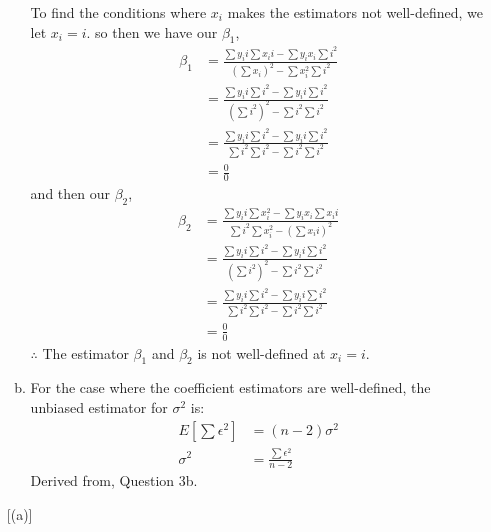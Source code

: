 \documentclass[12pt]{article}
\begin{document}
\begin{enumerate}[1.]
\begin{enumerate}[(a)]
            To find the conditions where $x_i$ makes the estimators not well-defined, we let $x_i = i$.
            so then we have our $\beta_1$,
            \begin{align*}
                \beta_1 &= \frac{\sum y_i i\sum  x_i i - \sum y_i  x_i \sum i^2}{(\sum  x_i)^2 - \sum  x_i^2 \sum i^2 } \\
                &= \frac{\sum y_i i\sum  i^2 - \sum y_i  i \sum i^2}{(\sum i^2)^2 - \sum i^2 \sum i^2 }\\
                &= \frac{\sum y_i i\sum  i^2 - \sum y_i  i \sum i^2}{\sum i^2\sum i^2 - \sum i^2 \sum i^2 }\\
                &= \frac{0}{0}
            \end{align*}
            and then our $\beta_2$, 
            \begin{align*}
                \beta_2 &= \frac{\sum  y_i i \sum  x_i^2 - \sum  y_i x_i \sum  x_i i}{\sum  i^2 \sum  x_i^2 - (\sum  x_i i)^2} \\
                &= \frac{\sum  y_i i \sum   i^2 - \sum  y_i  i \sum   i^2}{(\sum i^2)^2 - \sum i^2 \sum i^2 }\\
                &= \frac{\sum  y_i i \sum   i^2 - \sum  y_i  i \sum   i^2}{\sum i^2 \sum i^2 - \sum i^2 \sum i^2 }\\
                &= \frac{0}{0}
            \end{align*}
            $\therefore$ The estimator $\beta_1$ and $\beta_2$ is not well-defined at $x_i = i$.

            \item For the case where the coefficient estimators are well-defined, the unbiased estimator for $\sigma^2$ is:
            \begin{align*}
                E[\sum \epsilon^2] &= (n-2)\sigma^2 \\ 
                \sigma^2 &= \frac{\sum \epsilon^2}{n-2}
            \end{align*}
            Derived from, Question 3b.
        \end{enumerate}[(a)]
    

\end{enumerate}
\end{document}
